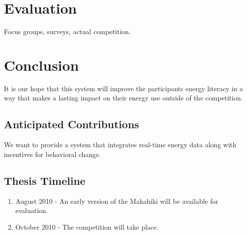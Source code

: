 \chapter{Evaluation}
\label{evaluation}

Focus groups, surveys, actual competition.

\chapter{Conclusion}
\label{conclusion}

It is our hope that this system will improve the participants energy literacy in a way that makes a lasting impact on their energy use outside of the competition.

\section{Anticipated Contributions}

We want to provide a system that integrates real-time energy data along with incentives for behavioral change.

\section{Thesis Timeline}

\begin{enumerate}
\item August 2010 - An early version of the Makahiki will be available for evaluation.
\item October 2010 - The competition will take place.
\end{enumerate}